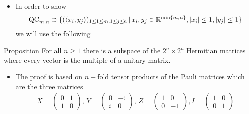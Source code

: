 \begin{frame}
	\begin{itemize}
		\item  In order to show 
		\begin{align*} \textup{QC}_{m,n} \supset \{ (\langle x_i,y_j \rangle)_{1 \le 1 \le m, 1 \le j \le n} \,| \, x_i,y_j \in 				\mathbb{R}^{ \min \{m,n \} }, \vert x_i  \vert \le 1, \vert y_j \vert \le 1  \} 
		\end{align*}  we will use the following 
	\end{itemize}
	\pause
	\begin{block}{Proposition}
		For all $ n \ge 1 $ there is a subspace of the $ 2^n \times 2^n $ Hermitian matrices where every vector is the multiple of a unitary matrix. 
	\end{block}
	\pause
	\begin{itemize}
		\item The proof is based on $ n- $fold tensor products of the Pauli matrices which are the three matrices 
		\begin{align*}
		X = \begin{pmatrix}
		0 & 1 \\ 1 & 0
		\end{pmatrix}, \, Y = \begin{pmatrix}
		0 & -i \\ i & 0
		\end{pmatrix}, \, Z = \begin{pmatrix}
		1 & 0 \\ 0 & -1
		\end{pmatrix}, I = \begin{pmatrix}
		1 & 0 \\ 0 & 1
		\end{pmatrix}
		\end{align*}
	\end{itemize}
\end{frame}
